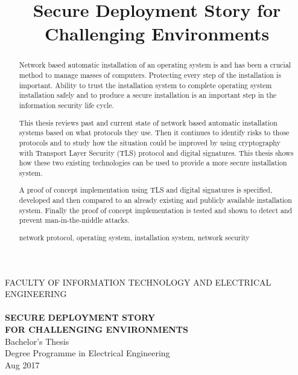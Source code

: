 \documentclass[a4paper,12pt,titlepage]{dithesis}
\title{Secure Deployment Story for Challenging Environments}
\begin{document}
\begin{titlepage}
	{{\small FACULTY OF INFORMATION TECHNOLOGY AND ELECTRICAL ENGINEERING}\\}
	\vspace{65 mm}
	{\textbf{\LARGE \getfirstname\ \getlastname}\\}
	\vspace{15 mm}
	{\textbf{\LARGE SECURE DEPLOYMENT STORY\\FOR CHALLENGING ENVIRONMENTS\\}}
	\vspace{70 mm}
	{\large {Bachelor's Thesis}\\}
	{\large {Degree Programme in Electrical Engineering}\\}
	{\large {Aug 2017}\\}
\end{titlepage}


\begin{abstract}

Network based automatic installation of an operating system is and has
been a crucial method to manage masses of computers. Protecting every
step of the installation is important. Ability to trust the
installation system to complete operating system installation safely
and to produce a secure installation is an important step in the
information security life cycle.

This thesis reviews past and current state of network based automatic
installation systems based on what protocols they use. Then it
continues to identify risks to those protocols and to study how the
situation could be improved by using cryptography with Transport Layer
Security (TLS) protocol and digital signatures. This thesis shows how
these two existing technologies can be used to provide a more secure
installation system.

A proof of concept implementation using TLS and digital signatures is
specified, developed and then compared to an already existing and
publicly available installation system. Finally the proof of concept
implementation is tested and shown to detect and prevent
man-in-the-middle attacks.

\keywords network protocol, operating system, installation system, network security
\end{abstract}
\end{document}
